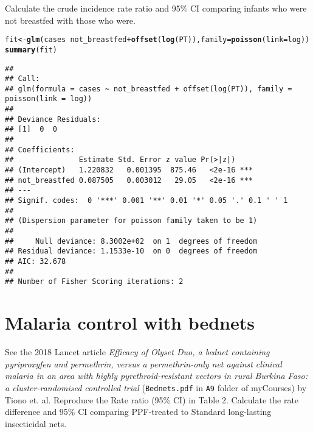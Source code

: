\documentclass[landscape,twocolumn,letterpaper,9pt,reqno]{article}\usepackage[]{graphicx}\usepackage[]{color}
\newcommand{\hlopt}[1]{\textcolor[rgb]{0,0,0}{#1}}%
\newcommand{\hlstd}[1]{\textcolor[rgb]{0.345,0.345,0.345}{#1}}%
\newcommand{\hlkwb}[1]{\textcolor[rgb]{0.69,0.353,0.396}{#1}}%
\newcommand{\hlkwc}[1]{\textcolor[rgb]{0.333,0.667,0.333}{#1}}%
\newcommand{\hlkwd}[1]{\textcolor[rgb]{0.737,0.353,0.396}{\textbf{#1}}}%
\newenvironment{knitrout}{}{} %
\begin{document}
Calculate the crude incidence rate ratio and 95\% CI comparing infants who were not breastfed with those who were.

\begin{knitrout}\small
{}\color{fgcolor}
\begin{alltt}
\hlstd{fit} \hlkwb{<-} \hlkwd{glm}\hlstd{(cases} \hlopt{~} \hlstd{not_breastfed} \hlopt{+} \hlkwd{offset}\hlstd{(}\hlkwd{log}\hlstd{(PT)),} \hlkwc{family} \hlstd{=} \hlkwd{poisson}\hlstd{(}\hlkwc{link} \hlstd{= log))}
\hlkwd{summary}\hlstd{(fit)}
\end{alltt}
\begin{verbatim}
## 
## Call:
## glm(formula = cases ~ not_breastfed + offset(log(PT)), family = poisson(link = log))
## 
## Deviance Residuals: 
## [1]  0  0
## 
## Coefficients:
##               Estimate Std. Error z value Pr(>|z|)    
## (Intercept)   1.220832   0.001395  875.46   <2e-16 ***
## not_breastfed 0.087505   0.003012   29.05   <2e-16 ***
## ---
## Signif. codes:  0 '***' 0.001 '**' 0.01 '*' 0.05 '.' 0.1 ' ' 1
## 
## (Dispersion parameter for poisson family taken to be 1)
## 
##     Null deviance: 8.3002e+02  on 1  degrees of freedom
## Residual deviance: 1.1533e-10  on 0  degrees of freedom
## AIC: 32.678
## 
## Number of Fisher Scoring iterations: 2
\end{verbatim}

\end{knitrout}







\section{Malaria control with bednets}

See the 2018 Lancet article \textit{Efficacy of Olyset Duo, a bednet containing pyriproxyfen and permethrin, versus a permethrin-only net against clinical malaria in an area with highly pyrethroid-resistant vectors in rural Burkina Faso: a cluster-randomised
controlled trial} (\texttt{Bednets.pdf} in \texttt{A9} folder of myCourses) by Tiono et. al. Reproduce the Rate ratio (95\% CI) in Table 2. Calculate the rate difference and 95\% CI comparing PPF-treated to Standard long-lasting insecticidal nets.
\end{document}
